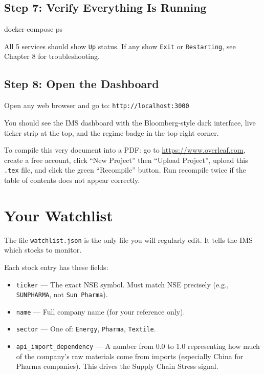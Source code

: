 \documentclass[12pt, a4paper]{report}
\begin{document}
\section{Step 7: Verify Everything Is Running}

\begin{termbox}
docker-compose ps
\end{termbox}

\begin{successbox}
All 5 services should show \texttt{Up} status. If any show \texttt{Exit} or \texttt{Restarting}, see Chapter 8 for troubleshooting.
\end{successbox}

\section{Step 8: Open the Dashboard}

Open any web browser and go to: \texttt{http://localhost:3000}

You should see the IMS dashboard with the Bloomberg-style dark interface, live ticker strip at the top, and the regime badge in the top-right corner.

\begin{tipbox}
To compile this very document into a PDF: go to \url{https://www.overleaf.com}, create a free account, click ``New Project'' then ``Upload Project'', upload this \texttt{.tex} file, and click the green ``Recompile'' button. Run recompile twice if the table of contents does not appear correctly.
\end{tipbox}

\chapter{Your Watchlist}

The file \texttt{watchlist.json} is the only file you will regularly edit. It tells the IMS which stocks to monitor.

Each stock entry has these fields:

\begin{itemize}
\item \texttt{ticker} --- The exact NSE symbol. Must match NSE precisely (e.g., \texttt{SUNPHARMA}, not \texttt{Sun Pharma}).
\item \texttt{name} --- Full company name (for your reference only).
\item \texttt{sector} --- One of: \texttt{Energy}, \texttt{Pharma}, \texttt{Textile}.
\item \texttt{api\_import\_dependency} --- A number from 0.0 to 1.0 representing how much of the company's raw materials come from imports (especially China for Pharma companies). This drives the Supply Chain Stress signal.
\end{itemize}
\end{document}
